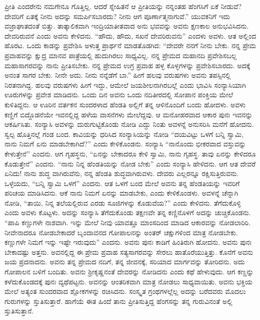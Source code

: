 ಪ್ರೀತಿ ಎಂದರೇನು ನಮಗೇನೂ ಗೊತ್ತಿಲ್ಲ. ಆದರೆ ಸ್ನೇಹಿತನೆ ಆ ಪ್ರೀತಿಯನ್ನು ನನ್ನಂತಹ ಹೆಂಗಸಿಗೆ ಏಕೆ ನೀಡುವೆ? ದೇವರಿಗೆ ಏತಕ್ಕೆ ನೀನು ಅದನ್ನು ಸಮರ್ಪಿಸಬಾರದು? ನೀನು ಆಗ ಪೂರ್ಣಾತ್ಮನಾಗುವೆ.” ಯುವಕನಿಗೆ ಇದು ವಜ್ರಾಘಾತದಂತೆ ಬಿತ್ತು. ತಾತ್ಕಾಲಿಕವಾಗಿ ಇಂದ್ರಿಯಾತೀತವಾದ ಅನು ಭವವನ್ನು ಅವನು ಕ್ಷಣಕಾಲ ಅನುಭವಿಸಿದನು. ದೇವರಿರುವನೆ ಎಂದು ಅವನು ಕೇಳಿದನು. “ಹೌದು, ಹೌದು, ಸಖನೆ ದೇವರಿರುವನು” ಎಂದಳು ಅವಳು. ಆತ ಅಲ್ಲಿಂದ ಹೊರಟ. ಒಂದು ಕಾಡನ್ನು ಪ್ರವೇಶಿಸಿ ಅಳುತ್ತ ಪ್ರಾರ್ಥನೆ ಮಾಡತೊಡಗಿದ: “ದೇವರೇ ನನಗೆ ನೀನು ಬೇಕು. ನನ್ನ ಪ್ರೇಮ ಪ್ರವಾಹವನ್ನು ಕ್ಷುದ್ರ ಮಾನವ ಪಾತ್ರೆಯಲ್ಲಿ ಹುದುಗಿರಲು ಸಾಧ್ಯವಿಲ್ಲ. ನನ್ನ ಪ್ರೇಮದ ಮಹಾನದಿ ಪ್ರವೇಶಿಸ\-ಬಲ್ಲ ಮಹಾಸಾಗರವನ್ನು ನಾನು ಪ್ರೀತಿಸಬೇಕು. ನನ್ನ ಪ್ರೇಮದ ಉಗ್ರ ಪ್ರವಾಹ ಹಳ್ಳ ಕೊಳ್ಳಗಳನ್ನು ಪ್ರವೇಶಿಸಬಾರದು. ಅದಕ್ಕೆ ಅನಂತ ಸಾಗರ ಬೇಕು. ನೀನೇ ಅದು. ನೀನು ನನ್ನೆಡೆಗೆ ಬಾ.” ಹೀಗೆ ಹಲವು ವರುಷಗಳು ಅವನು ತಪಸ್ಸಿನಲ್ಲಿ ನಿರತ\-ನಾಗಿದ್ದ. ಹಲವು ವರುಷಗಳು ಹೀಗೆ ಇದ್ದು, ಆಮೇಲೆ ಜಯಶೀಲನಾಗಿರಬಲ್ಲೆ ಎಂದು ಭಾವಿಸಿ ಸಂನ್ಯಾಸಿಯಾಗಿ ಊರುಗಳನ್ನು ಪ್ರವೇಶ ಮಾಡಿದನು. ಒಂದು ದಿನ ಅವನು ಒಂದು ನದಿತೀರದಲ್ಲಿ ಸೋಪಾನ ಪಂಕ್ತಿಯ ಮೇಲೆ ಕುಳಿತಿದ್ದನು. ಆ ಊರಿನ ವರ್ತಕನ ಸುಂದರಳಾದ ಹೆಂಡತಿ ಅಲ್ಲಿಗೆ ತನ್ನ ಆಳಿನೊಂದಿಗೆ ಬಂದು ಹೋದಳು. ಅವಳು ಕಣ್ಣಿಗೆ ಬಿದ್ದೊಡನೆಯೇ ಇವನ\-ಲ್ಲಿದ್ದ ಹಳೆಯ ವಾಸನೆಗಳು ಮೇಲೆದ್ದವು. ಆ ಮನೋಹರವಾದ ಆಕಾರ ಪುನಃ ಇವನನ್ನು ಆಕರ್ಷಿಸಿತು. ಸಂನ್ಯಾಸಿ ಅವಳನ್ನು ದುರುಗುಟ್ಟಿಕೊಂಡು ನೋಡಿ ಎದ್ದು ನಿಂತು ಅವಳನ್ನೆ ಅನುಸರಿಸಿ ಮನೆಗೆ ಹೋದನು. ಸ್ವಲ್ಪ ಹೊತ್ತಿನಲ್ಲೆ ಗಂಡ ಬಂದ. ಕಾವಿಯನ್ನು ಧರಿಸಿದ ಸಂನ್ಯಾಸಿಯನ್ನು ನೋಡಿ “ದಯವಿಟ್ಟು ಒಳಗೆ ಬನ್ನಿ ಸ್ವಾಮಿ, ನಾನು ನಿಮಗೆ ಏನು ಮಾಡಬೇಕಾಗಿದೆ?” ಎಂದು ಕೇಳಿಕೊಂಡನು. ಸಂನ್ಯಾಸಿ “ನಾನೊಂದು ಭೀಕರವಾದ ವಸ್ತುವನ್ನು ಕೇಳುತ್ತೇನೆ” ಎಂದನು. ಆಗ ಗೃಹಸ್ಥನು, “ಏನನ್ನು ಬೇಕಾದರೂ ಕೇಳಿ ಸ್ವಾಮಿ, ನಾನು ಗೃಹಸ್ಥ. ತಾವು ಏನನ್ನು ಕೇಳಿದರೂ ಕೊಡುತ್ತೇನೆ” ಎಂದನು. “ನಾನು ನಿನ್ನ ಹೆಂಡತಿಯನ್ನು ನೋಡ ಬೇಕು” ಎಂದು ಸಂನ್ಯಾಸಿ ಹೇಳಿದನು. ಆಗ ಆತ ದೇವರೆ ಏನಿದು! ನಾನು ಶುದ್ಧ ವಾಗಿರುವೆನು, ನನ್ನ ಹೆಂಡತಿ ಶುದ್ಧವಾಗಿರುವಳು. ದೇವರು ಎಲ್ಲರನ್ನೂ ರಕ್ಷಿಸುತ್ತಿರುವನು. ಒಳ್ಳೆಯದು, “ಬನ್ನಿ ಸ್ವಾಮಿ ಒಳಗೆ” ಎಂದನು. ಆತ ಒಳಗೆ ಬಂದ ಮೇಲೆ ಅವನು ತನ್ನ ಹೆಂಡತಿಯನ್ನು ಇವರಿಗೆ ಪರಿಚಯ ಮಾಡಿಸಿದನು. ಆಕೆ ನಾನು ನಿಮಗೆ ಏನನ್ನು ಮಾಡಬೇಕು, ಎಂದು ಕೇಳಿಕೊಂಡಳು. ಅವಳನ್ನೆ ಚೆನ್ನಾಗಿ ನೋಡಿ, “ತಾಯಿ, ನಿನ್ನ ತಲೆಯಲ್ಲಿರುವ ಎರಡು ಸೂಜಿಗಳನ್ನು ಕೊಡುವೆಯ?” ಎಂದು ಕೇಳಿದನು. ತೆಗೆದುಕೊಳ್ಳಿ ಎಂದು ಅವಳು ಕೊಟ್ಟಳು. ಅದನ್ನು ಸಂನ್ಯಾಸಿ ತೆಗೆದುಕೊಂಡು ತಕ್ಷಣವೇ ತನ್ನ ಕಣ್ಣಿನೊಳಗೆ ಅದನ್ನು ಚುಚ್ಚಿಕೊಂಡನು. “ಪಾಪಿ ಕಣ್ಣುಗಳೇ ನಾಶವಾಗಿ. ಇನ್ನು ಮೇಲೆ ನೀವು ಯಾವತ್ತೂ ಮಾಂಸದಿಂದ ಮಾಡಿದ ಆಕಾರವನ್ನು ನೋಡಲಾರಿರಿ. ನೀವೇನಾದರೂ ನೋಡಬೇಕಾದರೆ ಬೃಂದಾವನದ ಗೋಪಾಲನನ್ನು ಅಂತರ್​ ಚಕ್ಷುಗಳಿಂದ ಮಾತ್ರ ನೋಡಬೇಕು. ಕಣ್ಣುಗಳೇ ನಿಮಗೆ ಇನ್ನು ಇಷ್ಟೇ ಇರುವುದು” ಎಂದನು. ಅವನು ಪುನಃ ಕಾಡಿಗೆ ಹಿಂತಿರುಗಿ ಹೋದನು. ಅವನು ಪುನಃ ಬೇಕಾದಷ್ಟು ಅತ್ತನು. ಅವನಲ್ಲಿದ್ದ ಈ ಪ್ರೇಮ ಪ್ರವಾಹ ಸತ್ಯಸಾಗರವನ್ನು ಸೇರಲು ಹಾತೊರೆಯುತ್ತಿತ್ತು. ಕೊನೆಗೆ ಅವನು ಜಯ ಪ್ರದನಾದನು. ಅವನು ತನ್ನ ಪ್ರೇಮದ ನದಿಗೆ, ತನ್ನ ಜೀವನಕ್ಕೆ, ಸರಿಯಾದ ಮಾರ್ಗವನ್ನು ತೋರಿದನು. ಅದು ಗೋಪಾಲನ ಬಳಿಗೆ ಬಂದಿತು. ಅವನು ಶ‍್ರೀಕೃಷ್ಣನಂತೆ ದೇವರನ್ನು ನೋಡಿದನು ಎಂದು ಕಥೆ ಹೇಳುವುದು. ಆಗ ಕಣ್ಣನ್ನು ಕಳೆದುಕೊಂಡದಕ್ಕೆ ಪುನಃ ವ್ಯಥೆಪಟ್ಟನು. ಅವನನ್ನು ಆಂತರಿಕವಾಗಿ ಮಾತ್ರ ನೋಡಲು ಸಾಧ್ಯವಾಯಿತು. ಅವನು ಭಕ್ತಿಯ ಮೇಲೆ ಅತ್ಯಂತ ಸುಂದರವಾದ ಶ್ಲೋಕಗಳನ್ನು ರಚಿಸಿದನು. ಸಂಸ್ಕೃತ ಗ್ರಂಥಗಳಲ್ಲೆಲ್ಲ ಅದನ್ನು ಬರೆದವರು ಮೊದಲು ಗುರುಗಳನ್ನು ಸ್ತುತಿಸುತ್ತಾರೆ. ಹಾಗೆಯೆ ಈತ ಹಿಂದೆ ತಾನು ಪ್ರೀತಿಸುತ್ತಿದ್ದ ಹೆಂಗಸನ್ನು ತನ್ನ ಗುರುವಿನಂತೆ ಅಲ್ಲಿ ಸ್ತುತಿಸುತ್ತಾನೆ.

